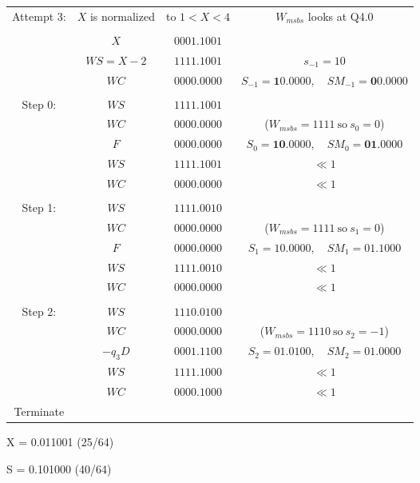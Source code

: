 \documentclass[12pt]{article}
\begin{document}
{\small
\begin{center}
\begin{tabular}{cccc}
    Attempt 3:& $X$ is normalized& to $1<X<4$&$W_{msbs}$ looks at Q4.0\\
    &&&\\
            &$X     $&$0001.1001$&\\
            &$WS=X-2$&$1111.1001$& $s_{-1}=10$\\
            &$WC    $&$0000.0000$&$S_{-1}=\mathbf{1}0.0000,\quad SM_{-1}=\mathbf{0}0.0000$ \\
    \hdashline\\
    Step 0: &$WS    $&$1111.1001$&\\
            &$WC    $&$0000.0000$&($W_{msbs}=1111\ \text{so}\ s_0=0$)\\
            &$F     $&$0000.0000$&$S_0=\mathbf{10}.0000,\quad SM_0=\mathbf{01}.0000$\\
    \cline{2-3}
            &$WS    $&$1111.1001$&$\ll1$\\
            &$WC    $&$0000.0000$&$\ll1$\\
    \hdashline\\
    Step 1: &$WS    $&$1111.0010$&\\
            &$WC    $&$0000.0000$&($W_{msbs}=1111\ \text{so}\ s_1=0$)\\
            &$F     $&$0000.0000$&$S_1=\mathbf{10.0}000,\quad SM_1=\mathbf{01.1}000$\\
    \cline{2-3}
            &$WS    $&$1111.0010$&$\ll1$\\
            &$WC    $&$0000.0000$&$\ll1$\\
    \hdashline\\
    Step 2: &$WS    $&$1110.0100$&\\
            &$WC    $&$0000.0000$&($W_{msbs}=1110\ \text{so}\ s_2=-1$)\\
            &$-q_3D $&$0001.1100$&$S_2=\mathbf{01.01}00,\quad SM_2=\mathbf{01.00}00$\\
    \cline{2-3}
            &$WS    $&$1111.1000$&$\ll1$\\
            &$WC    $&$0000.1000$&$\ll1$\\
    Terminate&&&
\end{tabular}
\end{center}
}

\vfill
\eject

X = 0.011001 (25/64)

S = 0.101000 (40/64)
\end{document}

